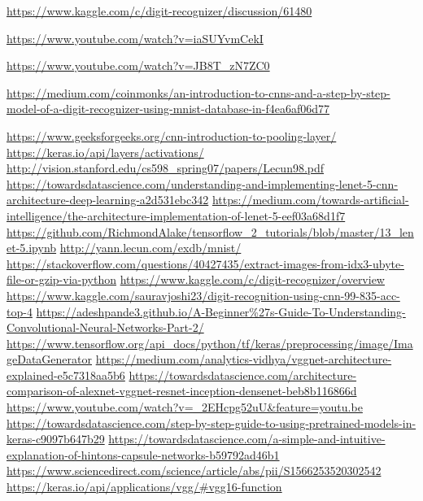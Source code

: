 \documentclass[a4paper,11pt]{article}
\begin{document}
\newpage
\begin{thebibliography}{9}
\url{https://www.kaggle.com/c/digit-recognizer/discussion/61480}

\url{https://www.youtube.com/watch?v=iaSUYvmCekI}

\url{https://www.youtube.com/watch?v=JB8T_zN7ZC0}

\url{https://medium.com/coinmonks/an-introduction-to-cnns-and-a-step-by-step-model-of-a-digit-recognizer-using-mnist-database-in-f4ea6af06d77}

\url{https://www.geeksforgeeks.org/cnn-introduction-to-pooling-layer/}
\url{https://keras.io/api/layers/activations/}
\url{http://vision.stanford.edu/cs598_spring07/papers/Lecun98.pdf}
\url{https://towardsdatascience.com/understanding-and-implementing-lenet-5-cnn-architecture-deep-learning-a2d531ebc342}
\url{https://medium.com/towards-artificial-intelligence/the-architecture-implementation-of-lenet-5-eef03a68d1f7}
\url{https://github.com/RichmondAlake/tensorflow_2_tutorials/blob/master/13_lenet-5.ipynb}
\url{http://yann.lecun.com/exdb/mnist/}
\url{https://stackoverflow.com/questions/40427435/extract-images-from-idx3-ubyte-file-or-gzip-via-python}
\url{https://www.kaggle.com/c/digit-recognizer/overview}
\url{https://www.kaggle.com/sauravjoshi23/digit-recognition-using-cnn-99-835-acc-top-4}
\url{https://adeshpande3.github.io/A-Beginner%27s-Guide-To-Understanding-Convolutional-Neural-Networks-Part-2/}
\url{https://www.tensorflow.org/api_docs/python/tf/keras/preprocessing/image/ImageDataGenerator}
\url{https://medium.com/analytics-vidhya/vggnet-architecture-explained-e5c7318aa5b6}
\url{https://towardsdatascience.com/architecture-comparison-of-alexnet-vggnet-resnet-inception-densenet-beb8b116866d}
\url{https://www.youtube.com/watch?v=_2EHcpg52uU&feature=youtu.be}
\url{https://towardsdatascience.com/step-by-step-guide-to-using-pretrained-models-in-keras-c9097b647b29}
\url{https://towardsdatascience.com/a-simple-and-intuitive-explanation-of-hintons-capsule-networks-b59792ad46b1}
\url{https://www.sciencedirect.com/science/article/abs/pii/S1566253520302542}
\url{https://keras.io/api/applications/vgg/#vgg16-function}

\end{thebibliography}
\end{document}
